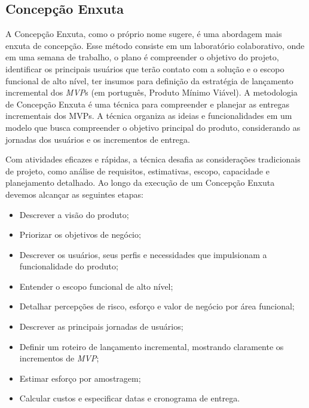 \documentclass[10pt]{article}
\begin{document}
        
    \subsection{Concepção Enxuta}\label{subsec:literatura-inception}
        
        A Concepção Enxuta, como o próprio nome sugere, é uma abordagem mais enxuta de concepção. Esse método consiste em  um laboratório colaborativo, onde em uma semana de trabalho, o plano é compreender o objetivo do projeto, identificar os principais usuários que terão contato com a solução e o escopo funcional de alto nível, ter insumos para definição da estratégia de lançamento incremental dos \textit{MVP}s (em português, Produto Mínimo Viável). A metodologia de Concepção Enxuta é uma técnica para compreender e planejar as entregas incrementais dos MVPs. A técnica organiza as ideias e funcionalidades em um modelo que busca compreender o objetivo principal do produto, considerando as jornadas dos usuários e os incrementos de entrega.
        
        Com atividades eficazes e rápidas, a técnica desafia as considerações tradicionais de projeto, como análise de requisitos, estimativas, escopo, capacidade e planejamento detalhado. Ao longo da execução de um Concepção Enxuta devemos alcançar as seguintes etapas:
        
        \begin{itemize}
            \item Descrever a visão do produto;
            \item Priorizar os objetivos de negócio;
            \item Descrever os usuários, seus perfis e necessidades que impulsionam a funcionalidade do produto;
            \item Entender o escopo funcional de alto nível;
            \item Detalhar percepções de risco, esforço e valor de negócio por área funcional;
            \item Descrever as principais jornadas de usuários;
            \item Definir um roteiro de lançamento incremental, mostrando claramente os incrementos de \textit{MVP};
            \item Estimar esforço por amostragem;
            \item Calcular custos e especificar datas e cronograma de entrega.
        \end{itemize}
        
\end{document}
